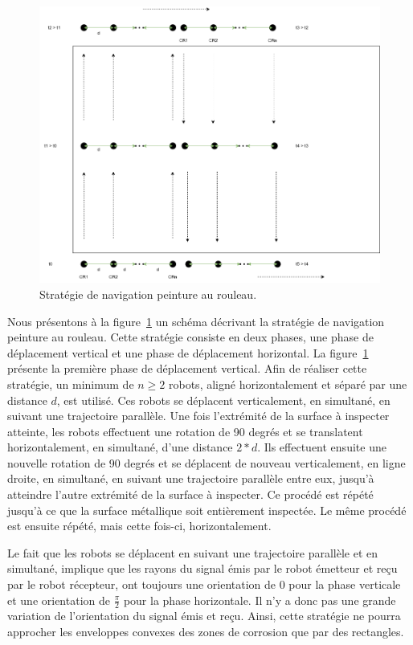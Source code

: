 \documentclass[francais,RandD]{rapportPFE}
\begin{document}
				\begin{figure}[h!]
					\centering
					\includegraphics[scale=0.5]{graphics/peinture_au_rouleau1.png}
					\caption{Stratégie de navigation peinture au rouleau.}
					\label{fig:peinture_au_rouleau1}
				\end{figure}

				Nous présentons à la figure~\ref{fig:peinture_au_rouleau1} un schéma décrivant la stratégie de navigation peinture au rouleau.
				Cette stratégie consiste en deux phases, une phase de déplacement vertical et une phase de déplacement horizontal.
				La figure~\ref{fig:peinture_au_rouleau1} présente la première phase de déplacement vertical.
				Afin de réaliser cette stratégie, un minimum de $n \ge 2$ robots, aligné horizontalement et séparé par une distance $d$, est utilisé.
				Ces robots se déplacent verticalement, en simultané, en suivant une trajectoire parallèle.
				Une fois l'extrémité de la surface à inspecter atteinte, les robots effectuent une rotation de 90 degrés et se translatent horizontalement, en simultané, d'une distance $2 * d$.
				Ils effectuent ensuite une nouvelle rotation de 90 degrés et se déplacent de nouveau verticalement, en ligne droite, en simultané, en suivant une trajectoire parallèle entre eux, jusqu'à atteindre l'autre extrémité de la surface à inspecter.
				Ce procédé est répété jusqu'à ce que la surface métallique soit entièrement inspectée.
				Le même procédé est ensuite répété, mais cette fois-ci, horizontalement.

				Le fait que les robots se déplacent en suivant une trajectoire parallèle et en simultané, implique que les rayons du signal émis par le robot émetteur et reçu par le robot récepteur, ont toujours une orientation de $0$ pour la phase verticale et une orientation de $\frac{\pi}{2}$ pour la phase horizontale.
				Il n'y a donc pas une grande variation de l'orientation du signal émis et reçu.
				Ainsi, cette stratégie ne pourra approcher les enveloppes convexes des zones de corrosion que par des rectangles.
\end{document}

